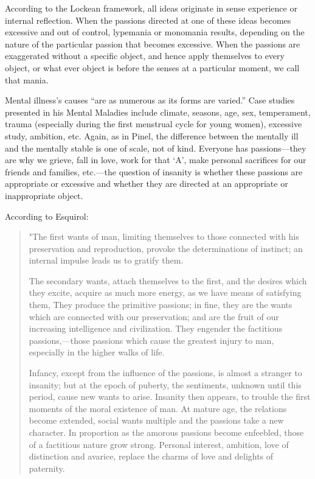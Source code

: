 \begin{refsection}
According to the Lockean framework, all ideas originate in sense experience or internal reflection. When the passions directed at one of these ideas becomes excessive and out of control, lypemania or monomania results, depending on the nature of the particular passion that becomes excessive. When the passions are exaggerated without a specific object, and hence apply themselves to every object, or what ever object is before the senses at a particular moment, we call that mania.

Mental illness's causes ``are as numerous as its forms are varied.'' Case studies presented in his Mental Maladies include climate, seasons, age, sex, temperament, trauma (especially during the first menstrual cycle for young women), excessive study, ambition, etc. Again, as in Pinel, the difference between the mentally ill and the mentally stable is one of scale, not of kind. Everyone has passions---they are why we grieve, fall in love, work for that `A', make personal sacrifices for our friends and families, etc.---the question of insanity is whether these passions are appropriate or excessive and whether they are directed at an appropriate or inappropriate object.

According to Esquirol:

\begin{quote}

"The first wants of man, limiting themselves to those connected with his preservation and reproduction, provoke the determinations of instinct; an internal impulse leads us to gratify them.

The secondary wants, attach themselves to the first, and the desires which they excite, acquire as much more energy, as we have means of satisfying them, They produce the primitive passions; in fine, they are the wants which are connected with our preservation; and are the fruit of our increasing intelligence and civilization. They engender the factitious passions,---those passions which cause the greatest injury to man, especially in the higher walks of life.

Infancy, except from the influence of the passions, is almost a stranger to insanity; but at the epoch of puberty, the sentiments, unknown until this period, cause new wants to arise. Insanity then appears, to trouble the first moments of the moral existence of man.
At mature age, the relations become extended, social wants multiple and the passions take a new character. In proportion as the amorous passions become enfeebled, those of a factitious nature grow strong. Personal interest, ambition, love of distinction and avarice, replace the charms of love and delights of paternity.


\end{quote}
\end{refsection}

